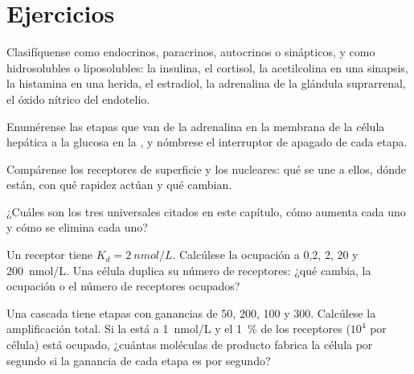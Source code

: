 \section{Ejercicios}

\begin{exercise}[$\star$]\label{exo:b2:cell-signalling:1}
Clasifíquense como endocrinos, paracrinos, autocrinos o sinápticos, y como
hidrosolubles o liposolubles: la insulina, el cortisol, la acetilcolina en
una sinapsis, la histamina en una herida, el estradiol, la adrenalina de
la glándula suprarrenal, el óxido nítrico del endotelio.
\end{exercise}

\begin{exercise}[$\star$]\label{exo:b2:cell-signalling:2}
Enumérense las etapas que van de la adrenalina en la membrana de la célula
hepática a la glucosa en la , y nómbrese el interruptor de apagado
de cada etapa.
\end{exercise}

\begin{exercise}[$\star$]\label{exo:b2:cell-signalling:3}
Compárense los receptores de superficie y los nucleares: qué se une a
ellos, dónde están, con qué rapidez actúan y qué cambian.
\end{exercise}

\begin{exercise}[$\star$]\label{exo:b2:cell-signalling:4}
¿Cuáles son los tres  universales citados en este
capítulo, cómo aumenta cada uno y cómo se elimina cada uno?
\end{exercise}

\begin{exercise}[$\star\star$]\label{exo:b2:cell-signalling:5}
Un receptor tiene $K_d = \qty{2}{nmol/L}$. Calcúlese la ocupación a
0,2, 2, 20 y \qty{200}{nmol/L}. Una célula duplica su número de
receptores: ¿qué cambia, la ocupación o el número de receptores ocupados?
\end{exercise}

\begin{exercise}[$\star\star$]\label{exo:b2:cell-signalling:6}
Una cascada tiene etapas con ganancias de 50, 200, 100 y 300. Calcúlese la
amplificación total. Si la  está a \qty{1}{nmol/L} y el
\qty{1}{\%} de los receptores ($10^{4}$ por célula) está ocupado, ¿cuántas
moléculas de producto fabrica la célula por segundo si la ganancia de cada
etapa es por segundo?
\end{exercise}

